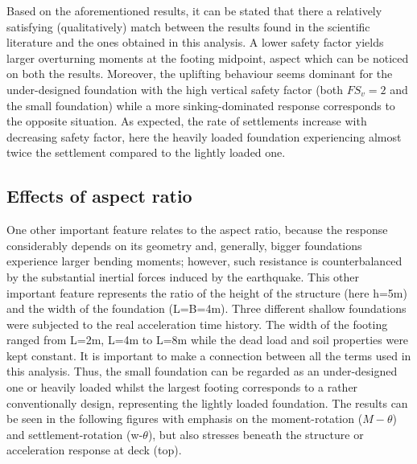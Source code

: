 
 Based on the aforementioned results, it can be stated that there a relatively satisfying (qualitatively) match between the results found in the scientific literature and the ones obtained in this analysis. A lower safety factor yields larger overturning moments at the footing midpoint, aspect which can be noticed on both the results. Moreover, the uplifting behaviour seems dominant for the under-designed foundation with the high vertical safety factor (both $FS_v=2$ and the small foundation) while a more sinking-dominated response corresponds to the opposite situation. As expected, the rate of settlements increase with decreasing safety factor, here the heavily loaded foundation experiencing almost twice the settlement compared to the lightly loaded one.
 
\newpage
\subsection{Effects of aspect ratio}
One other important feature relates to the aspect ratio, because the response considerably depends on its geometry and, generally, bigger foundations experience larger bending moments; however, such resistance is counterbalanced by the substantial inertial forces induced by the earthquake.  This other important feature represents the ratio of the height of the structure (here h=5m) and the width of the foundation (L=B=4m). Three different shallow foundations were subjected to the real acceleration time history. The width of the footing ranged from L=2m, L=4m to L=8m while the dead load and soil properties were kept constant. It is important to make a connection between all the terms used in this analysis. Thus, the small foundation can be regarded as an under-designed one or heavily loaded whilst the largest footing corresponds to a rather conventionally design, representing the lightly loaded foundation. The results can be seen in the following figures with emphasis on the moment-rotation ($M-\theta$) and settlement-rotation (\gls{w}-$\theta$), but also stresses beneath the structure or acceleration response at deck (top).


